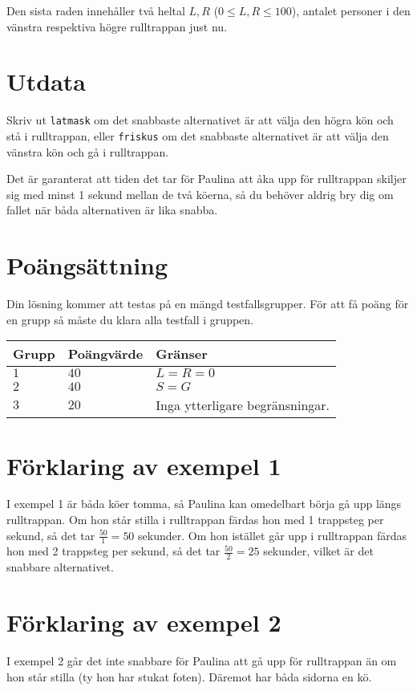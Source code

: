 Den sista raden innehåller två heltal $L, R$ ($0 \le L, R \le 100$), antalet personer i den vänstra respektiva högre rulltrappan just nu.

\section*{Utdata}
Skriv ut \texttt{latmask} om det snabbaste alternativet är att välja den högra kön och stå i rulltrappan, eller \texttt{friskus} om det snabbaste alternativet är att välja den vänstra kön och gå i rulltrappan.

Det är garanterat att tiden det tar för Paulina att åka upp för rulltrappan skiljer sig med minst 1 sekund mellan de två köerna, så du behöver aldrig bry dig om fallet när båda alternativen är lika snabba.

\section*{Poängsättning}
Din lösning kommer att testas på en mängd testfallsgrupper.
För att få poäng för en grupp så måste du klara alla testfall i gruppen.

\noindent
\begin{tabular}{| l | l | p{12cm} |}
  \hline
  Grupp & Poängvärde & Gränser \\ \hline
    $1$   & $40$     & $L = R = 0$ \\ \hline
    $2$   & $40$     & $S = G$ \\ \hline
    $3$   & $20$     & Inga ytterligare begränsningar. \\ \hline
\end{tabular}


\section*{Förklaring av exempel 1}
I exempel 1 är båda köer tomma, så Paulina kan omedelbart börja gå upp längs rulltrappan.
Om hon står stilla i rulltrappan färdas hon med 1 trappsteg per sekund, så det tar $\frac{50}{1} = 50$ sekunder.
Om hon istället går upp i rulltrappan färdas hon med 2 trappsteg per sekund, så det tar $\frac{50}{2} = 25$ sekunder, vilket är det snabbare alternativet.

\section*{Förklaring av exempel 2}
I exempel 2 går det inte snabbare för Paulina att gå upp för rulltrappan än om hon står stilla (ty hon har stukat foten).
Däremot har båda sidorna en kö.

